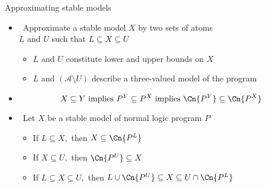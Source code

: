 \begin{frame}{Approximating stable models}
  \medskip
  \begin{itemize}
  \item<1->  \ Approximate a stable model $X$ by two sets of atoms\\
    $L$ and $U$ such that
    \(
    L\subseteq X\subseteq U
    \)
    \begin{itemize}\normalsize
    \item  $L$ and $U$ constitute lower and upper bounds on $X$
    \item  $L$ and $(\mathcal{A}\setminus U)$ describe a three-valued model of the program
    \end{itemize}
    \smallskip
  \item<2-> 
    \[
    X\subseteq Y
    \text{ implies }
    P^Y\subseteq P^X
    \text{ implies }
    \Cn{P^Y}\subseteq\Cn{P^X}
    \]
  \item<3->  \
    Let $X$ be a stable model of normal logic program $P$
    \begin{itemize}\normalsize
    \item<4-> If $L\subseteq X$,\pause[5]\
      then $X\subseteq\Cn{P^L}$
    \item<6-> If $X\subseteq U$,\pause[7]\
      then $\Cn{P^U}\subseteq X$
    \item<8-> If $L\subseteq X\subseteq U$,\pause[9]\
      then $L\cup\Cn{P^U}\subseteq X\subseteq U\cap\Cn{P^L}$
    \end{itemize}
  \end{itemize}
\end{frame}
